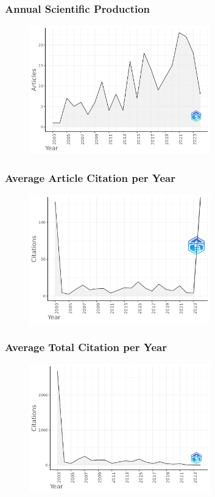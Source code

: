\documentclass[aspectratio=169]{beamer}
\begin{document}
\begin{frame}
	\frametitle{Annual Scientific Production}
	\begin{figure}
		\centering
		\includegraphics[width=0.7\textwidth]{figures/AnnualScientProd.png}
	\end{figure}
\end{frame}

\begin{frame}
	\frametitle{Average Article Citation per Year}
	\begin{figure}
		\centering
		\includegraphics[width=0.7\textwidth]{figures/AverArtCitperYear.png}
	\end{figure}
\end{frame}

\begin{frame}
	\frametitle{Average Total Citation per Year}
	\begin{figure}
		\centering
		\includegraphics[width=0.7\textwidth]{figures/AverTotCitperYear.png}
	\end{figure}
\end{frame}
\end{document}
